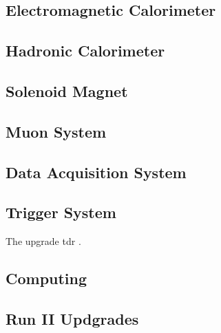 \subsection{Electromagnetic Calorimeter}
\label{SUBSECTION:ExperimentalApparatus_CMS_ECAL}

\subsection{Hadronic Calorimeter}
\label{SUBSECTION:ExperimentalApparatus_CMS_HCAL}

\subsection{Solenoid Magnet}
\label{SUBSECTION:ExperimentalApparatus_CMS_Magnet}

\subsection{Muon System}
\label{SUBSECTION:ExperimentalApparatus_CMS_Mouns}

\subsection{Data Acquisition System}
\label{SUBSECTION:ExperimentalApparatus_CMS_DAQ}

\subsection{Trigger System}
\label{SUBSECTION:ExperimentalApparatus_CMS_Trigger}

The upgrade tdr \cite{CMSL1UpgradeTDR}.

\subsection{Computing}
\label{SUBSECTION:ExperimentalApparatus_CMS_Computing}


\subsection{Run II Updgrades}
\label{SUBSECTION:ExperimentalApparatus_CMS_RUNII}


